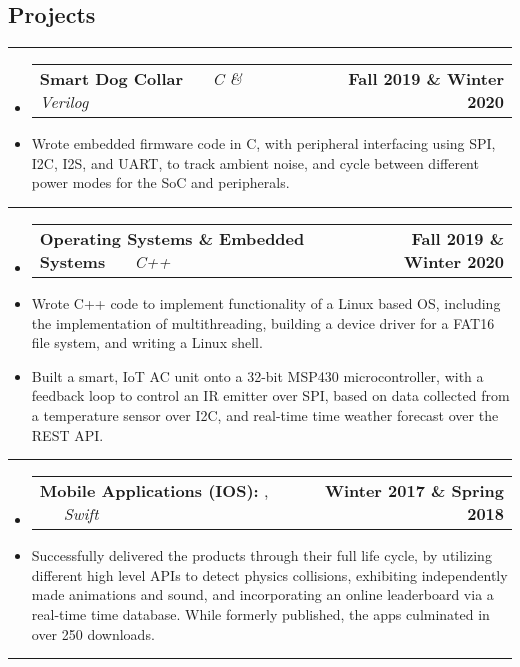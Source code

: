 \documentclass[10pt,letterpaper]{article}
\makeatletter
\newcommand{\header}[2]
{
	\begin{tabular*}{\linewidth}{l @{\extracolsep{\fill}} r}
		\hspace{-27pt} #1 & #2 \\
	\end{tabular*}
}
\newcommand{\sectionbreak}
{
	\vspace{-1.35em}
	\rule{\textwidth}{1.7pt}
	\vspace{-1.8em}
}
\makeatother
\begin{document}
\vspace{-1.5em}

\subsection*{Projects}
\sectionbreak


\begin{itemize}
	\item[]
		\header
		{
			\textbf{Smart Dog Collar}
			\emph{\smash{Senior Design Project}} \ \ \ \footnotesize \emph{C \& Verilog}
		}
		{\textbf{Fall 2019 \& Winter 2020}}
	\item 
		Wrote embedded firmware code in C, with peripheral interfacing using SPI, I2C, I2S, and UART, to track ambient noise,
		and cycle between different power modes for the SoC and peripherals.

\end{itemize}

\hrule

\begin{itemize}
	\item[]
		\header
		{
			\textbf{Operating Systems \& Embedded Systems}
			\emph{\smash{Relevant Course Project}} \ \ \ \footnotesize \emph{C++}
		}
		{\textbf{Fall 2019 \& Winter 2020}}
	\item 
		Wrote C++ code to implement functionality of a Linux based OS, including the implementation of multithreading, building a device driver for a FAT16 file system, and writing a Linux shell.
	\item 
		Built a smart, IoT AC unit onto a 32-bit MSP430 microcontroller, with a feedback loop to control an IR emitter over SPI, based on data collected from a temperature sensor over I2C, and real-time time weather forecast over the REST API. 

\end{itemize}

\hrule

\begin{itemize}
	\item[]
		\header
		{
			\textbf{Mobile Applications (IOS): }
			\href{https://appadvice.com/app/round-bound/1369632746}{\emph{\underline{\smash{Round 'a Bound}}}}, 
			\href{https://appadvice.com/app/tic-tac-emoji/1346934986}{\emph{\underline{\smash{Tic-Tac Emoji}}}} \ \ \ \footnotesize  \emph{Swift}
		}
		{\textbf{Winter 2017 \& Spring 2018}}
	\item 
		Successfully delivered the products through their full life cycle, by utilizing different high level APIs to detect physics collisions, exhibiting independently made animations and sound, and incorporating an online leaderboard via a real-time time database. While formerly published, the apps culminated in over 250 downloads.
\end{itemize}
\hrule
\end{document}
